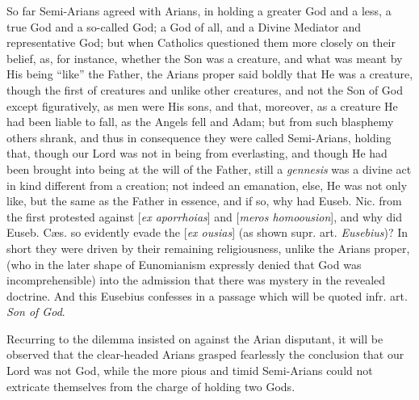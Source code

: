 So far Semi-Arians agreed with Arians, in holding
a greater God and a less, a true God and a so-called God; a God of
all, and a Divine Mediator and representative God; but when Catholics
questioned them more closely on their belief, as, for instance,
whether the Son was a creature, and what was meant by His being ``like''
the Father, the Arians proper said boldly that He was a creature,
though the first of creatures and unlike other creatures, and not the
Son of God except figuratively, as men were His sons, and that,
moreover, as a creature He had been liable to fall, as the Angels fell
and Adam; but from such blasphemy others shrank, and thus in
consequence they were called Semi-Arians, holding that, though our
Lord was not in being from everlasting, and though He had been brought
into being at the will of the Father, still a \emph{gennesis} was a
divine act in kind different from a creation; not indeed an emanation,
else, He was not only like, but the same as the Father in essence, and
if so, why had Euseb. Nic. from the first protested against [\emph{ex
aporrhoias}] and [\emph{meros homoousion}], and why did Euseb. Cæs.
so evidently evade the [\emph{ex ousias}] (as shown supr. art. \emph{Eusebius})?
In short they were driven by their remaining religiousness, unlike the
Arians proper, (who in the later shape of Eunomianism expressly
denied that God was incomprehensible) into the admission that there
was mystery in the revealed doctrine. And this Eusebius confesses in a
passage which will be quoted infr. art. \emph{Son of God}.

Recurring to the dilemma insisted on against the
Arian disputant, it will be observed that the clear-headed Arians
grasped fearlessly the conclusion that our Lord was not God, while the
more pious and timid Semi-Arians could not extricate themselves from
the charge of holding two Gods.

